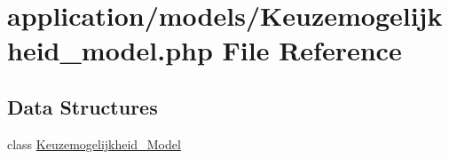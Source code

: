 \hypertarget{_keuzemogelijkheid__model_8php}{}\section{application/models/\+Keuzemogelijkheid\+\_\+model.php File Reference}
\label{_keuzemogelijkheid__model_8php}
\subsection*{Data Structures}
\begin{DoxyCompactItemize}
\item 
class \mbox{\hyperlink{class_keuzemogelijkheid___model}{Keuzemogelijkheid\+\_\+\+Model}}
\end{DoxyCompactItemize}
